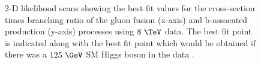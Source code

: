 \begin{figure}[tbh]

\caption{2-D likelihood scans showing the best fit values for the cross-section
times branching ratio of the gluon fusion (x-axis) and b-assocated production
(y-axis) processes using $8~\TeV$ data. The best fit point is indicated along with the best fit
point which would be obtained if there was a $125~\GeV$ SM Higgs boson in the data \cite{HIG-13-021}.}
\label{fig:2Dlikelihood}
\end{figure}

